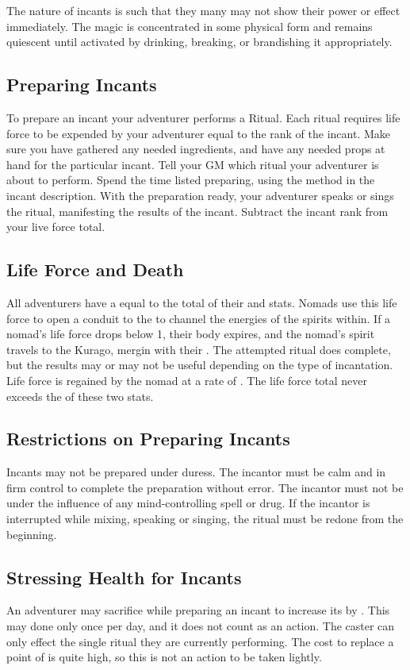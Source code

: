 \begin{multicols}{2}
The nature of incants is such that they many may not show their power or effect immediately. The magic is concentrated in some physical form and remains quiescent until activated by drinking, breaking, or brandishing it appropriately.
\subsection{Preparing Incants}
To prepare an incant your adventurer performs a Ritual. Each ritual requires life force to be expended by your adventurer equal to the rank of the incant. Make sure you have gathered any needed ingredients, and have any needed props at hand for the particular incant. Tell your GM which ritual your adventurer is about to perform. Spend the time listed preparing, using the method in the incant description. With the preparation ready, your adventurer speaks or sings the ritual, manifesting the results of the incant. Subtract the incant rank from your live force total.
\subsection{Life Force and Death}
All adventurers have a  equal to the total of their \HEA and \PER stats. Nomads use this life force to open a conduit to the  to channel the energies of the spirits within. If a nomad's life force drops below 1, their body expires, and the nomad's spirit travels to the Kurago, mergin with their . The attempted ritual does complete, but the results may or may not be useful depending on the type of incantation. Life force is regained by the nomad at a rate of . The life force total never exceeds the  of these two stats.
\subsection{Restrictions on Preparing Incants}
Incants may not be prepared under duress. The incantor must be calm and in firm control to complete the preparation without error. The incantor must not be under the influence of any mind-controlling spell or drug. If the incantor is interrupted while mixing, speaking or singing, the ritual must be redone from the beginning.
\subsection{Stressing Health for Incants}
An adventurer may sacrifice \tcdefine{1 \HEA} while preparing an incant to increase its  by . This may done only once per day, and it does not count as an action. The caster can only effect the single ritual they are currently performing. The cost to replace a point of \HEA is quite high, so this is not an action to be taken lightly.

\end{multicols}
